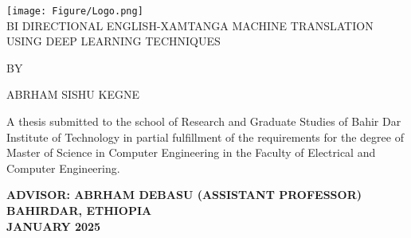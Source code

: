 \begin{titlepage}
    \begin{center}
        \texttt{[image: Figure/Logo.png]}\\[0.75cm]    
        \large \uppercase{
        {BI DIRECTIONAL ENGLISH-XAMTANGA MACHINE TRANSLATION USING DEEP LEARNING TECHNIQUES}}

        \vspace{1.0cm}

        BY
        \vspace{0.5cm}
            
        \large{\uppercase{ABRHAM SISHU KEGNE}}
            
        \vspace{0.5cm}
            
  \noindent \normalsize 
  A thesis submitted to the school of Research and Graduate Studies of Bahir Dar Institute of Technology in partial fulfillment of the requirements for the degree of Master of Science in Computer Engineering in the Faculty of Electrical and Computer Engineering.
        \vspace{0.5cm}
        
        \textbf{\uppercase{Advisor: Abrham Debasu } (ASSISTANT PROFESSOR)}\\
        \vspace{1.5cm}\large\uppercase{\textbf{BAHIRDAR, ETHIOPIA}}\\
        \large\uppercase{\textbf{JANUARY 2025}} 
    \end{center}
\end{titlepage}
